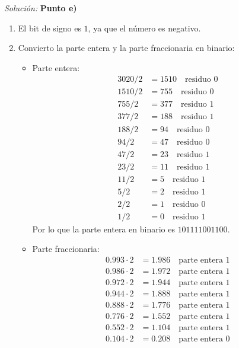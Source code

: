 \documentclass{article}
\newenvironment{solution}
    {\textit{Solución:}}
    {}
\begin{document}
\begin{solution}
\textbf{Punto e)}
\begin{enumerate}
    \item El bit de signo es $1$, ya que el número es negativo.
    \item Convierto la parte entera y la parte fraccionaria en binario:
    \begin{itemize}
        \item Parte entera:
        \begin{align*}
            3020/2 &= 1510 \quad \text{residuo } 0\\
            1510/2 &= 755 \quad \text{residuo } 0\\
            755/2 &= 377 \quad \text{residuo } 1\\
            377/2 &= 188 \quad \text{residuo } 1\\
            188/2 &= 94 \quad \text{residuo } 0\\
            94/2 &= 47 \quad \text{residuo } 0\\
            47/2 &= 23 \quad \text{residuo } 1\\
            23/2 &= 11 \quad \text{residuo } 1\\
            11/2 &= 5 \quad \text{residuo } 1\\
            5/2 &= 2 \quad \text{residuo } 1\\
            2/2 &= 1 \quad \text{residuo } 0\\
            1/2 &= 0 \quad \text{residuo } 1
        \end{align*}
        Por lo que la parte entera en binario es $101111001100$.
        \item Parte fraccionaria:
        \begin{align*}
            0.993 \cdot 2 &= 1.986 \quad \text{parte entera } 1\\
            0.986 \cdot 2 &= 1.972 \quad \text{parte entera } 1\\
            0.972 \cdot 2 &= 1.944 \quad \text{parte entera } 1\\
            0.944 \cdot 2 &= 1.888 \quad \text{parte entera } 1\\
            0.888 \cdot 2 &= 1.776 \quad \text{parte entera } 1 \\
            0.776 \cdot 2 &= 1.552 \quad \text{parte entera } 1\\
            0.552 \cdot 2 &= 1.104 \quad \text{parte entera } 1\\
            0.104 \cdot 2 &= 0.208 \quad \text{parte entera } 0\\

\end{align*}
\end{itemize}
\end{enumerate}
\end{solution}
\end{document}
